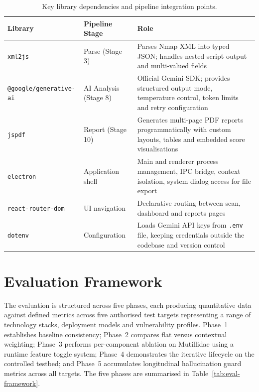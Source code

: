 \documentclass[12pt, a4paper, oneside]{report}
\begin{document}
\begin{table}[htbp]
\centering
\caption{Key library dependencies and pipeline integration points.}
\label{tab:keylibraries}
\small
\renewcommand{\arraystretch}{1.45}
\setlength{\tabcolsep}{5pt}
\begin{tabularx}{\textwidth}{
    >{\raggedright\arraybackslash}p{2.8cm}
    >{\raggedright\arraybackslash}p{2.0cm}
    >{\raggedright\arraybackslash}X
}
\toprule
\rowcolor{headerblue}
\textcolor{headertext}{\textbf{Library}} &
\textcolor{headertext}{\textbf{Pipeline Stage}} &
\textcolor{headertext}{\textbf{Role}} \\
\midrule
\rowcolor{rowlight}
\texttt{xml2js} &
Parse (Stage 3) &
Parses Nmap XML into typed JSON; handles nested script output and multi-valued fields \\

\rowcolor{rowwhite}
\texttt{@google/generative-ai} &
AI Analysis (Stage 8) &
Official Gemini SDK; provides structured output mode, temperature control, token limits and retry configuration \\

\rowcolor{rowlight}
\texttt{jspdf} &
Report (Stage 10) &
Generates multi-page PDF reports programmatically with custom layouts, tables and embedded score visualisations \\

\rowcolor{rowwhite}
\texttt{electron} &
Application shell &
Main and renderer process management, IPC bridge, context isolation, system dialog access for file export \\

\rowcolor{rowlight}
\texttt{react-router-dom} &
UI navigation &
Declarative routing between scan, dashboard and reports pages \\

\rowcolor{rowwhite}
\texttt{dotenv} &
Configuration &
Loads Gemini API keys from \texttt{.env} file, keeping credentials outside the codebase and version control \\
\bottomrule
\end{tabularx}
\renewcommand{\arraystretch}{1.0}
\end{table}

\FloatBarrier

\clearpage
\section{Evaluation Framework}
\label{sec:evaluation-framework}

The evaluation is structured across five phases, each producing quantitative data against defined metrics across five authorised test targets representing a range of technology stacks, deployment models and vulnerability profiles. Phase~1 establishes baseline consistency; Phase~2 compares flat versus contextual weighting; Phase~3 performs per-component ablation on Mutillidae using a runtime feature toggle system; Phase~4 demonstrates the iterative lifecycle on the controlled testbed; and Phase~5 accumulates longitudinal hallucination guard metrics across all targets. The five phases are summarised in Table~\ref{tab:eval-framework}.
\end{document}
